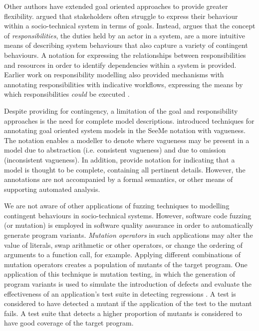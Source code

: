 \documentclass{sig-alternate}
\begin{document}
Other authors have extended goal oriented approaches to provide greater
flexibility.  \citet{sommerville09deriving} argued that stakeholders often
struggle to express their behaviour within a socio-technical system in terms of
goals.  Instead, \citeauthor{sommerville09deriving} argues that the concept of
\emph{responsibilities}, the duties held by an actor in a system, are a more
intuitive means of describing system behaviours that also capture a variety of
contingent behaviours.  A notation for expressing the relationships between
responsibilities and resources in order to identify dependencies within a system
is provided.  Earlier work on responsibility modelling also provided mechanisms
with annotating responsibilities with indicative workflows, expressing the means
by which responsibilities \emph{could} be executed
\citep{dewsbury07responsibility}.

Despite providing for contingency, a limitation of the goal and responsibility
approaches is the need for complete model descriptions. \citet{Herrmann1999}
introduced techniques for annotating goal oriented system models in the SeeMe
notation with vagueness.  The notation enables a modeller to denote where
vagueness may be present in a model due to abstraction (i.e. consistent
vagueness) and due to omission (inconsistent vagueness).  In addition,
\citeauthor{Herrmann1999} provide notation for indicating that a model is
thought to be complete, containing all pertinent details.  However, the
annotations are not accompanied by a formal semantics, or other means of
supporting automated analysis.

We are not aware of other applications of fuzzing techniques to modelling
contingent behaviours in socio-technical systems.  However, software code
fuzzing (or mutation) is employed in software quality assurance in order to
automatically generate program variants.  \emph{Mutation operators} in such
applications may alter the value of literals, swap arithmetic or other
operators, or change the ordering of arguments to a function call, for example.
Applying different combinations of mutation operators creates a population of
mutants of the target program.  One application of this technique is mutation
testing, in which the generation of program variants is used to simulate the
introduction of defects and evaluate the effectiveness of an application's test
suite in detecting regressions \citep{demillo78hints}.  A test is considered to
have detected a mutant if the application of the test to the mutant fails.  A
test suite that detects a higher proportion of mutants is considered to have
good coverage of the target program.
\end{document}
